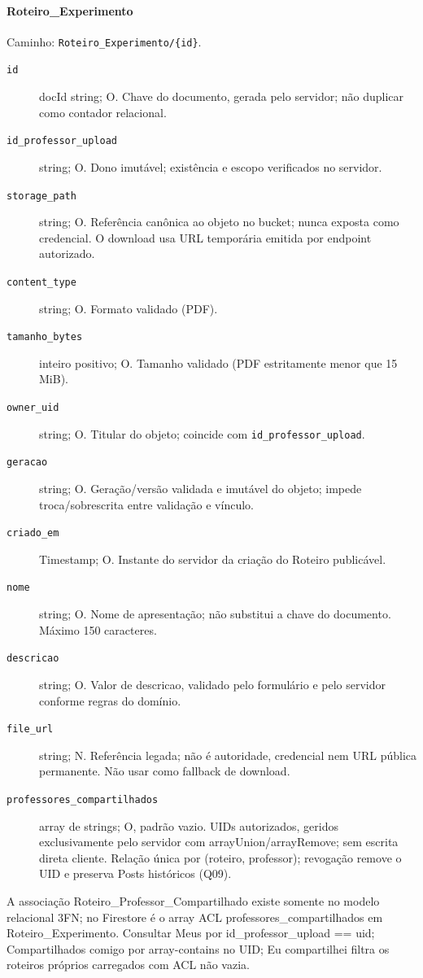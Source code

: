 \paragraph{Roteiro\_Experimento}\mbox{}\par
Caminho: \texttt{Roteiro\_Experimento/\{id\}}.
\begin{description}
\item[\texttt{id}] docId string; O. Chave do documento, gerada pelo servidor; não duplicar como contador relacional.
\item[\texttt{id\_professor\_upload}] string; O. Dono imutável; existência e escopo verificados no servidor.
\item[\texttt{storage\_path}] string; O. Referência canônica ao objeto no bucket; nunca exposta como credencial. O download usa URL temporária emitida por endpoint autorizado.
\item[\texttt{content\_type}] string; O. Formato validado (PDF).
\item[\texttt{tamanho\_bytes}] inteiro positivo; O. Tamanho validado (PDF estritamente menor que 15 MiB).
\item[\texttt{owner\_uid}] string; O. Titular do objeto; coincide com \texttt{id\_professor\_upload}.
\item[\texttt{geracao}] string; O. Geração/versão validada e imutável do objeto; impede troca/sobrescrita entre validação e vínculo.
\item[\texttt{criado\_em}] Timestamp; O. Instante do servidor da criação do Roteiro publicável.
\item[\texttt{nome}] string; O. Nome de apresentação; não substitui a chave do documento. Máximo 150 caracteres.
\item[\texttt{descricao}] string; O. Valor de descricao, validado pelo formulário e pelo servidor conforme regras do domínio.
\item[\texttt{file\_url}] string; N. Referência legada; não é autoridade, credencial nem URL pública permanente. Não usar como fallback de download.
\item[\texttt{professores\_compartilhados}] array de strings; O, padrão vazio. UIDs autorizados, geridos exclusivamente pelo servidor com arrayUnion/arrayRemove; sem escrita direta cliente. Relação única por (roteiro, professor); revogação remove o UID e preserva Posts históricos (Q09).
\end{description}

A associação Roteiro\_Professor\_Compartilhado existe somente no modelo relacional 3FN; no Firestore é o array ACL professores\_compartilhados em Roteiro\_Experimento. Consultar Meus por id\_professor\_upload == uid; Compartilhados comigo por array-contains no UID; Eu compartilhei filtra os roteiros próprios carregados com ACL não vazia.

